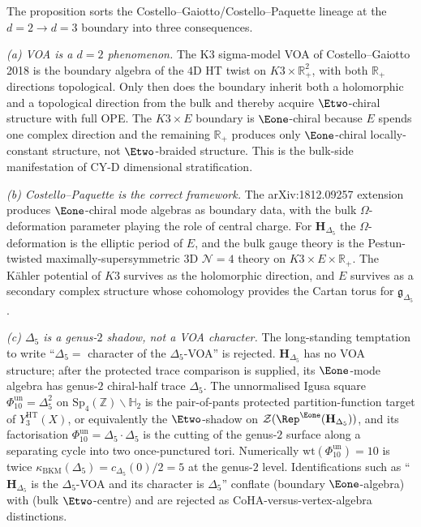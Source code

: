 \begin{remark}
\label{rem:qgf-e1-chiral-twisted-holography-death-survival}
The proposition sorts the Costello--Gaiotto/Costello--Paquette
lineage at the $d=2\to d=3$ boundary into three consequences.

\emph{(a) VOA is a $d=2$ phenomenon.} The K$3$ sigma-model VOA of
Costello--Gaiotto 2018 is the boundary algebra of the $4$D HT twist
on $K3\times\mathbb R_+^2$, with both $\mathbb R_+$ directions
topological. Only then does the boundary inherit both a holomorphic
and a topological direction from the bulk and thereby acquire
$\Etwo$-chiral structure with full OPE. The $K3\times E$ boundary is
$\Eone$-chiral because $E$ spends one complex direction and the
remaining $\mathbb R_+$ produces only $\Eone$-chiral locally-constant
structure, not $\Etwo$-braided structure. This is the bulk-side
manifestation of CY-D dimensional stratification.

\emph{(b) Costello--Paquette is the correct framework.} The
arXiv:1812.09257 extension produces $\Eone$-chiral mode algebras as
boundary data, with the bulk $\Omega$-deformation parameter playing
the role of central charge. For $\mathbf H_{\Delta_5}$ the
$\Omega$-deformation is the elliptic period of $E$, and the bulk
gauge theory is the Pestun-twisted maximally-supersymmetric
$3$D $\mathcal N=4$ theory on $K3\times E\times\mathbb R_+$. The
K\"ahler potential of $K3$ survives as the holomorphic direction, and
$E$ survives as a secondary complex structure whose cohomology provides
the Cartan torus for $\mathfrak g_{\Delta_5}$.

\emph{(c) $\Delta_5$ is a genus-$2$ shadow, not a VOA character.} The
long-standing temptation to write ``$\Delta_5=$ character of the
$\Delta_5$-VOA'' is rejected. $\mathbf H_{\Delta_5}$ has no VOA
structure; after the protected trace comparison is supplied, its
$\Eone$-mode algebra has genus-$2$ chiral-half trace $\Delta_5$. The
unnormalised Igusa square $\Phi_{10}^{\mathrm{un}}=\Delta_5^2$ on
$\mathrm{Sp}_4(\mathbb Z)\backslash\mathbb H_2$ is the pair-of-pants
protected partition-function target of $Y^{\mathrm{HT}}_3(X)$, or equivalently the
$\Etwo$-shadow on $\mathcal Z(\Rep^{\Eone}(\mathbf H_{\Delta_5}))$, and
its factorisation $\Phi_{10}^{\mathrm{un}}=\Delta_5\cdot\Delta_5$ is the cutting of
the genus-$2$ surface along a separating cycle into two once-punctured
tori. Numerically $\mathrm{wt}(\Phi_{10}^{\mathrm{un}})=10$ is twice
$\kappa_{\mathrm{BKM}}(\Delta_5)=c_{\Delta_5}(0)/2=5$ at
the genus-$2$ level. Identifications such as ``$\mathbf H_{\Delta_5}$
is the $\Delta_5$-VOA and its character is $\Delta_5$'' conflate
(boundary $\Eone$-algebra) with (bulk $\Etwo$-centre) and are rejected
as CoHA-versus-vertex-algebra distinctions.


\end{remark}

